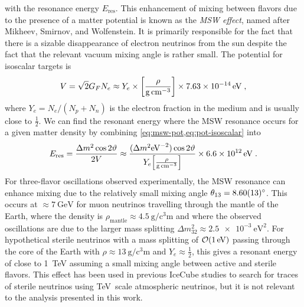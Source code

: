with the resonance energy $E_\mathrm{res}$.
This enhancement of mixing between flavors due to the presence of a matter potential is known as the \emph{MSW effect}, named after Mikheev, Smirnov, and Wolfenstein. It is primarily responsible for the fact that there is a sizable disappearance of electron neutrinos from the sun despite the fact that the relevant vacuum mixing angle is rather small.
The potential for isoscalar targets is
\begin{equation}
    V = \sqrt{2}G_F N_e \approx Y_e \times \qty[\frac{\rho}{\si{\gram\per\cm\cubed}}] \times \SI{7.63e-14}{\electronvolt}\;,\label{eq:pot-isoscalar}
\end{equation}
where $Y_e = N_e / (N_p + N_n)$ is the electron fraction in the medium and is usually close to $\frac{1}{2}$.
We can find the resonant energy where the MSW resonance occurs for a given matter density by combining \cref{eq:msw-pot,eq:pot-isoscalar} into
\begin{equation}
    E_\mathrm{res} = \frac{\Delta m^2 \cos 2\vartheta}{2V} \approx \frac{(\Delta m^2\si{\per\electronvolt\squared}) \cos 2\vartheta}{Y_e \qty[\frac{\rho}{\si{\gram\per\cm\cubed}}]}\times\SI{6.6e12}{\electronvolt}\;.
\end{equation}
For three-flavor oscillations observed experimentally, the MSW resonance can enhance mixing due to the relatively small mixing angle $\theta_{13}=\SI{8.6+-0.13}{\degree}$\cite{pdg}.  This occurs at $\approx \SI{7}{\giga\electronvolt}$ for muon neutrinos travelling through the mantle of the Earth, where the density is $\rho_\mathrm{mantle}\approx\SI{4.5}{\gram\per\cubic\centi\meter}$ and where the observed oscillations are due to the larger mass splitting $\Delta m^2_{32}\approx \SI{2.5e-3}{\electronvolt\squared}$.
For hypothetical sterile neutrinos with a mass splitting of $\order{\SI{1}{\electronvolt}}$ passing through the core of the Earth with $\rho\approx\SI{13}{\gram\per\cubic\centi\meter}$ and $Y_e\approx\frac{1}{2}$, this gives a resonant energy of close to \SI{1}{\tera\electronvolt} assuming a small mixing angle between active and sterile flavors. This effect has been used in previous IceCube studies\cite{MEOWS} to search for traces of sterile neutrinos using TeV~scale atmospheric neutrinos, but it is not relevant to the analysis presented in this work.

